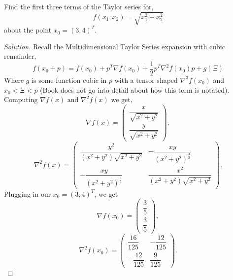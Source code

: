 \documentclass[12pt]{article}
\makeatletter
\theoremstyle{homework}
\newenvironment{exercise}[1]
{\def\@currentlabel{#1}\exercisecore}
{\endexercisecore}
\makeatother
\begin{document}
\begin{exercise}{6.5} Find the first three terms of the Taylor series for,
  \begin{equation*}
    f(x_1, x_2) = \sqrt{x_1^2 + x_2^2}
  \end{equation*}
  about the point $x_0 = (3, 4)^T$. 
  \begin{proof}[Solution]
    Recall the Multidimensional Taylor Series expansion with cubic remainder, 
    \begin{equation*}
      f(x_0 + p) = f(x_0) + p^T\nabla f(x_0) + \dfrac{1}{2} p^T\nabla^2 f(x_0)p + g(\Xi)
    \end{equation*}
    Where $g$ is some function cubic in $p$ with a tensor shaped $\nabla^3 f(x_0)$ and $ x_0< \Xi < p$ (Book does not go 
    into detail about how this term is notated). Computing $\nabla f(x)$ and $\nabla^2 f(x)$ we get, 
    \begin{equation*}
      \nabla f(x) = 
      \begin{pmatrix}
        \dfrac{x}{\sqrt{x^2+y^2}}\\[17pt]
        \dfrac{y}{\sqrt{x^2+y^2}}
      \end{pmatrix},
    \end{equation*}
    \begin{equation*}
      \nabla^2 f(x) = 
      \begin{pmatrix}
        \dfrac{y^2}{\left(x^2+y^2\right)\sqrt{x^2+y^2}}& -\dfrac{xy}{\left(x^2+y^2\right)^{\frac{3}{2}}}\\[20pt]
        -\dfrac{xy}{\left(x^2+y^2\right)^{\frac{3}{2}}} & \dfrac{x^2}{\left(x^2+y^2\right)\sqrt{x^2+y^2}}
      \end{pmatrix}.
    \end{equation*}
    Plugging in our $x_0 = (3, 4)^T$, we get
    \begin{equation*}
      \nabla f(x_0) = 
      \begin{pmatrix}
        \dfrac{3}{5}\\[10pt]
        \dfrac{3}{5}
      \end{pmatrix},
    \end{equation*}
    \begin{equation*}
      \nabla^2 f(x_0) = 
      \begin{pmatrix}
        \dfrac{16}{125}& -\dfrac{12}{125}\\[10pt]
        -\dfrac{12}{125} & \dfrac{9}{125}
      \end{pmatrix}.
    \end{equation*}

\end{proof}
\end{exercise}
\end{document}
